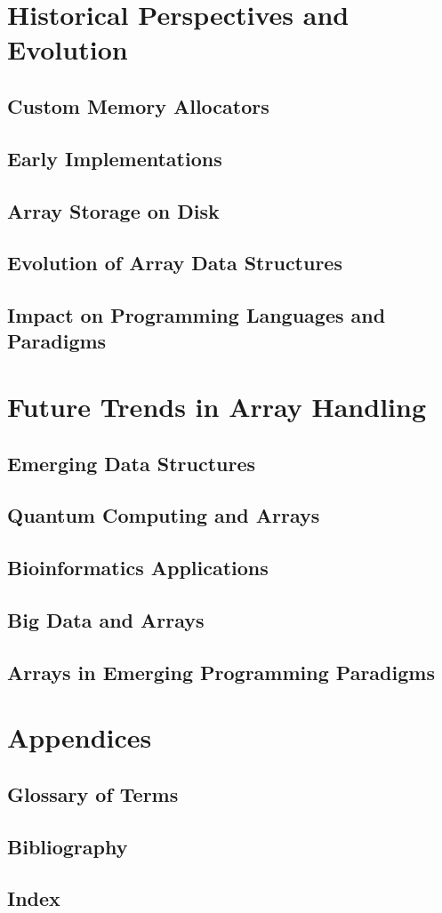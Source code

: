 \documentclass[12pt, oneside]{book}
\begin{document}
	\chapter{Historical Perspectives and Evolution}
	\section{Custom Memory Allocators}\section{Early Implementations}
	\section{Array Storage on Disk}\section{Evolution of Array Data Structures}
	\section{Impact on Programming Languages and Paradigms}
	
	\chapter{Future Trends in Array Handling}
	\section{Emerging Data Structures}
	\section{Quantum Computing and Arrays}
	\section{Bioinformatics Applications}
	\section{Big Data and Arrays}
	\section{Arrays in Emerging Programming Paradigms}
	\chapter{Appendices}
	\section{Glossary of Terms}
	\section{Bibliography}
	\section{Index}
	
\printbibliography[heading=bibintoc]

\printindex
\end{document}
